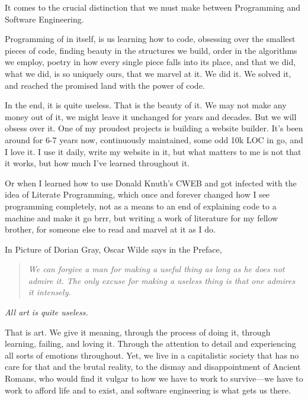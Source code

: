 \documentclass[12pt]{article}
\begin{document}
It comes to the crucial distinction that we must make between Programming and
Software Engineering.

Programming of in itself, is us learning how to code, obsessing over the
smallest pieces of code, finding beauty in the structures we build, order in the
algorithms we employ, poetry in how every single piece falls into its place, and
that we did, what we did, is so uniquely ours, that we marvel at it. We did
it. We solved it, and reached the promised land with the power of code.

In the end, it is quite useless. That is the beauty of it. We may not make any
money out of it, we might leave it unchanged for years and decades. But we will
obsess over it. One of my proudest projects is building a website builder. It's
been around for 6-7 years now, continuously maintained, some odd 10k LOC in go,
and I love it. I use it daily, write my website in it, but what matters to me is
not that it works, but how much I've learned throughout it.

Or when I learned how to use Donald Knuth's CWEB and got infected with the idea
of Literate Programming, which once and forever changed how I see programming
completely, not as a means to an end of explaining code to a machine and make it
go brrr, but writing a work of literature for my fellow brother, for someone
else to read and marvel at it as I do. 

In Picture of Dorian Gray, Oscar Wilde says in the Preface,

\begin{quote}
\emph{We can forgive a man for making a useful
thing as long as he does not admire it. The
only excuse for making a useless thing is that
one admires it intensely.}            
\end{quote}

\begin{flushright}
  \textit{All art is quite useless.}
\end{flushright}

That is art. We give it meaning, through the process of doing it, through
learning, failing, and loving it. Through the attention to detail and
experiencing all sorts of emotions throughout. Yet, we live in a capitalistic
society that has no care for that and the brutal reality, to the dismay and
disappointment of Ancient Romans, who would find it vulgar to how we have to
work to survive---we have to work to afford life and to exist, and software
engineering is what gets us there.
\end{document}
